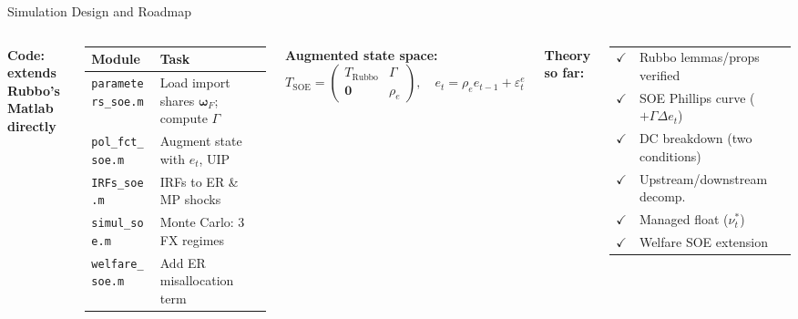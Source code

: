 \documentclass[aspectratio=169, 10pt]{beamer}
\newcommand{\bom}{\bm{\omega}_F}
\begin{document}
\begin{frame}{Simulation Design and Roadmap}

\begin{columns}[t]

{\footnotesize \textbf{Code: extends Rubbo's Matlab directly}}

\vspace{3pt}
{\scriptsize
\begin{tabular}{@{}p{2.9cm}p{4.0cm}@{}}
\toprule
\textbf{Module} & \textbf{Task} \\
\midrule
\texttt{parameters\_soe.m} & Load import shares $\bom$; compute $\Gamma$ \\
\texttt{pol\_fct\_soe.m} & Augment state with $e_t$, UIP \\
\texttt{IRFs\_soe.m} & IRFs to ER \& MP shocks \\
\texttt{simul\_soe.m} & Monte Carlo: 3 FX regimes \\
\texttt{welfare\_soe.m} & Add ER misallocation term \\
\bottomrule
\end{tabular}
}

\vspace{3pt}
{\footnotesize \textbf{Augmented state space:}}
\vspace{-6pt}
{\small\[T_{\text{SOE}} = \begin{pmatrix} T_{\text{Rubbo}} & \Gamma \\ \bm{0} & \rho_e \end{pmatrix},\quad e_t = \rho_e e_{t-1} + \varepsilon_t^e\]}
\vspace{-6pt}


{\footnotesize \textbf{Theory so far:}}

\vspace{2pt}
{\footnotesize
\begin{tabular}{@{}ll@{}}
$\checkmark$ & Rubbo lemmas/props verified \\
$\checkmark$ & SOE Phillips curve ($+\Gamma\Delta e_t$) \\
$\checkmark$ & DC breakdown (two conditions) \\
$\checkmark$ & Upstream/downstream decomp. \\
$\checkmark$ & Managed float ($\nu_t^*$) \\
$\checkmark$ & Welfare SOE extension \\
\end{tabular}
}


\end{columns}
\end{frame}
\end{document}

